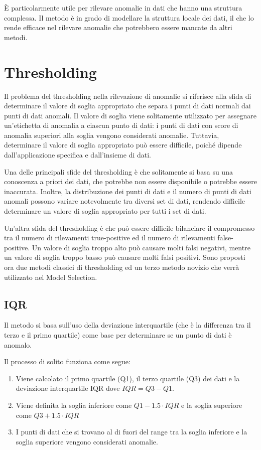  È particolarmente utile per rilevare anomalie in dati che hanno una struttura complessa. Il metodo è in grado di modellare la struttura locale dei dati, il che lo rende efficace nel rilevare anomalie che potrebbero essere mancate da altri metodi.




\section{Thresholding}
Il problema del thresholding nella rilevazione di anomalie si riferisce alla sfida di determinare il valore di soglia appropriato che separa i punti di dati normali dai punti di dati anomali. Il valore di soglia viene solitamente utilizzato per assegnare un'etichetta di anomalia a ciascun punto di dati: i punti di dati con score di anomalia superiori alla soglia vengono considerati anomalie. Tuttavia, determinare il valore di soglia appropriato può essere difficile, poiché dipende dall'applicazione specifica e dall'insieme di dati.

Una delle principali sfide del thresholding è che solitamente si basa su una conoscenza a priori dei dati, che potrebbe non essere disponibile o potrebbe essere inaccurata. Inoltre, la distribuzione dei punti di dati e il numero di punti di dati anomali possono variare notevolmente tra diversi set di dati, rendendo difficile determinare un valore di soglia appropriato per tutti i set di dati.

Un'altra sfida del thresholding è che può essere difficile bilanciare il compromesso tra il numero di rilevamenti true-positive ed il numero di rilevamenti false-positive. Un valore di soglia troppo alto può causare molti falsi negativi, mentre un valore di soglia troppo basso può causare molti falsi positivi.
Sono proposti ora due metodi classici di thresholding ed un terzo metodo novizio che verrà utilizzato nel Model Selection.

\subsection{IQR}
Il metodo si basa sull'uso della deviazione interquartile (che è la differenza tra il terzo e il primo quartile) come base per determinare se un punto di dati è anomalo.

Il processo di solito funziona come segue:
\begin{enumerate}
\item Viene calcolato il primo quartile (Q1), il terzo quartile (Q3) dei dati e la deviazione interquartile IQR dove $IQR = Q3-Q1$.
\item Viene definita la soglia inferiore come $Q1 - 1.5 \cdot IQR$ e la soglia superiore come $Q3 + 1.5 \cdot IQR$
\item I punti di dati che si trovano al di fuori del range tra la soglia inferiore e la soglia superiore vengono considerati anomalie.
\end{enumerate}

